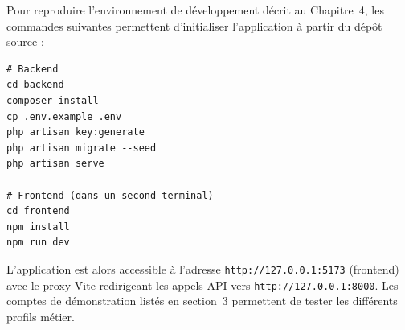 Pour reproduire l'environnement de développement décrit au Chapitre~4, les commandes
suivantes permettent d'initialiser l'application à partir du dépôt source :

\begin{lstlisting}[language={}, caption={Commandes d'initialisation de l'application}]
# Backend
cd backend
composer install
cp .env.example .env
php artisan key:generate
php artisan migrate --seed
php artisan serve

# Frontend (dans un second terminal)
cd frontend
npm install
npm run dev
\end{lstlisting}

\medskip

L'application est alors accessible à l'adresse \texttt{http://127.0.0.1:5173} (frontend)
avec le proxy Vite redirigeant les appels API vers \texttt{http://127.0.0.1:8000}.
Les comptes de démonstration listés en section~3 permettent de tester les différents
profils métier.

\newpage
